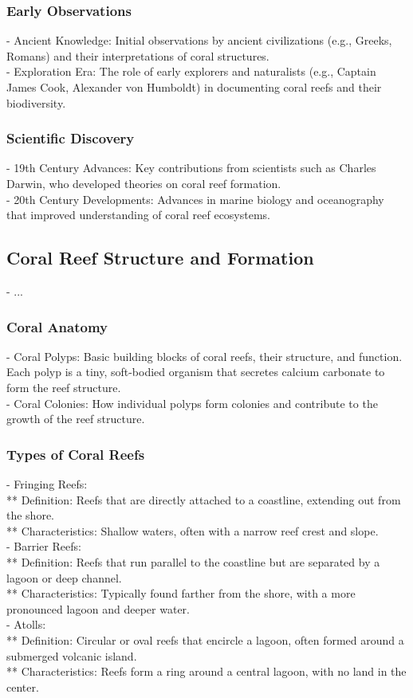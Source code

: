 \subsubsection{Early Observations}
- Ancient Knowledge: Initial observations by ancient civilizations (e.g., Greeks, Romans) and their interpretations of coral structures. \\
- Exploration Era: The role of early explorers and naturalists (e.g., Captain James Cook, Alexander von Humboldt) in documenting coral reefs and their biodiversity.
\subsubsection{Scientific Discovery}
- 19th Century Advances: Key contributions from scientists such as Charles Darwin, who developed theories on coral reef formation. \\
- 20th Century Developments: Advances in marine biology and oceanography that improved understanding of coral reef ecosystems.

\subsection{Coral Reef Structure and Formation}
- ... 
\subsubsection{Coral Anatomy}
- Coral Polyps: Basic building blocks of coral reefs, their structure, and function. Each polyp is a tiny, soft-bodied organism that secretes calcium carbonate to form the reef structure. \\
- Coral Colonies: How individual polyps form colonies and contribute to the growth of the reef structure. 
\subsubsection{Types of Coral Reefs}
- Fringing Reefs: \\
** Definition: Reefs that are directly attached to a coastline, extending out from the shore. \\
** Characteristics: Shallow waters, often with a narrow reef crest and slope. \\
- Barrier Reefs: \\
** Definition: Reefs that run parallel to the coastline but are separated by a lagoon or deep channel. \\
** Characteristics: Typically found farther from the shore, with a more pronounced lagoon and deeper water. \\
- Atolls: \\
** Definition: Circular or oval reefs that encircle a lagoon, often formed around a submerged volcanic island. \\
** Characteristics: Reefs form a ring around a central lagoon, with no land in the center. 
